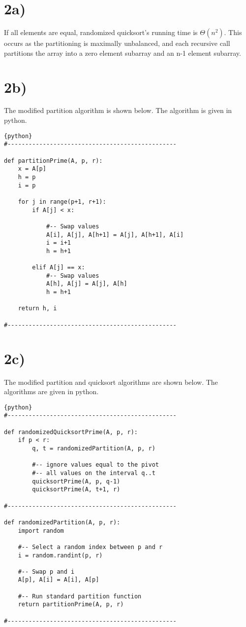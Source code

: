 \documentclass[a4paper,11pt]{article}
\begin{document}

\section*{2a)}
If all elements are equal, randomized quicksort's running time is
$\Theta(n^2)$.  This occurs as the partitioning is maximally unbalanced,
and each recursive call partitions the array into a zero element 
subarray and an n-1 element subarray.  
\section*{2b)}
The modified partition algorithm is shown below.  The algorithm
is given in python.

\begin{lstlisting}{python}
#------------------------------------------------

def partitionPrime(A, p, r):
    x = A[p]
    h = p
    i = p
    
    for j in range(p+1, r+1):
        if A[j] < x:
        
        	#-- Swap values
            A[i], A[j], A[h+1] = A[j], A[h+1], A[i] 
            i = i+1
            h = h+1
            
        elif A[j] == x:
        	#-- Swap values
            A[h], A[j] = A[j], A[h] 
            h = h+1
            
    return h, i

#------------------------------------------------
\end{lstlisting}

\section*{2c)}
The modified partition and quicksort algorithms are shown below.  
The algorithms are given in python.

\begin{lstlisting}{python}
#------------------------------------------------

def randomizedQuicksortPrime(A, p, r):
    if p < r:
        q, t = randomizedPartition(A, p, r)
                
        #-- ignore values equal to the pivot
        #-- all values on the interval q..t
        quicksortPrime(A, p, q-1)
        quicksortPrime(A, t+1, r)
        
#------------------------------------------------

def randomizedPartition(A, p, r):
    import random
    
    #-- Select a random index between p and r
    i = random.randint(p, r)
    
    #-- Swap p and i
    A[p], A[i] = A[i], A[p]
    
    #-- Run standard partition function
    return partitionPrime(A, p, r)

#------------------------------------------------    

\end{lstlisting}
\end{document}
